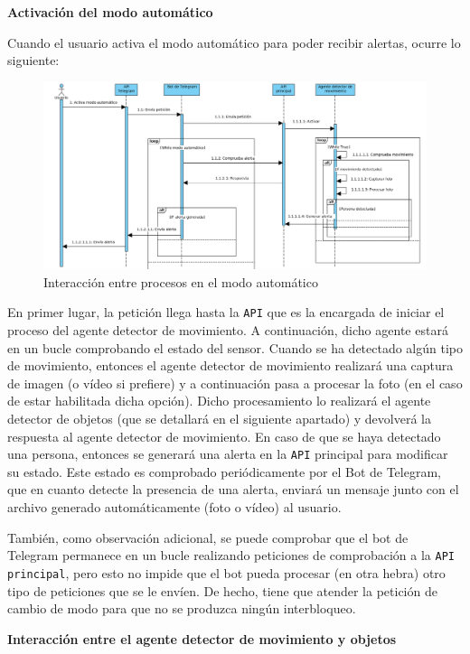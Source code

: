 \textbf{Activación del modo automático}

Cuando el usuario activa el modo automático para poder recibir alertas, ocurre lo siguiente:

\begin{figure}[H]
	\centering
	\includegraphics[scale=0.42]{images/88}
	\caption{Interacción entre procesos en el modo automático}
	\label{f:5}
\end{figure}

En primer lugar, la petición llega hasta la \texttt{API} que es la encargada de iniciar el proceso del agente detector de movimiento. A continuación, dicho agente estará en un bucle comprobando el estado del sensor. Cuando se ha detectado algún tipo de movimiento, entonces el agente detector de movimiento realizará una captura de imagen (o vídeo si prefiere) y a continuación pasa a procesar la foto (en el caso de estar habilitada dicha opción). Dicho procesamiento lo realizará el agente detector de objetos (que se detallará en el siguiente apartado) y devolverá la respuesta al agente detector de movimiento. En caso de que se haya detectado una persona, entonces se generará una alerta en la \texttt{API} principal para modificar su estado. Este estado es comprobado periódicamente por el Bot de Telegram, que en cuanto detecte la presencia de una alerta, enviará un mensaje junto con el archivo generado automáticamente (foto o vídeo) al usuario.

También, como observación adicional, se puede comprobar que el bot de Telegram permanece en un bucle realizando peticiones de comprobación a la \texttt{API principal}, pero esto no impide que el bot pueda procesar (en otra hebra) otro tipo de peticiones que se le envíen. De hecho, tiene que atender la petición de cambio de modo para que no se produzca ningún interbloqueo.

\textbf{Interacción entre el agente detector de movimiento y objetos}

